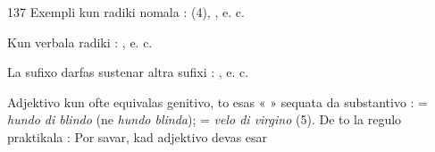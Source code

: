 \begin{VUpage}[141]{137}
Exempli kun radiki nomala : \nl
{} (4), \cc
{}, e. c.\parplein

Kun verbala radiki : \nl
{}\cc
{}, e. c.

La sufixo  darfas sustenar altra sufixi : \nl
{}, e. c.

Adjektivo kun  ofte equivalas genitivo, to esas «  »\nl
sequata da substantivo :  = \textit{hundo di blindo}\nl
(ne \textit{hundo blinda});  = \textit{velo di virgino} (5). De\nl
to la regulo praktikala : Por savar, kad adjektivo devas esar\parplein
\end{VUpage}

